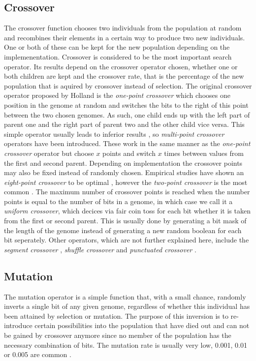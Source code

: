 \subsection{Crossover}
\label{sec:crossover}

The crossover function chooses two individuals from the population at random and recombines their elements in a certain way to produce two new individuals. One or both of these can be kept for the new population depending on the implemenentation. Crossover is considered to be the most important search operator\cite{16}. Its results depend on the crossover operator chosen, whether one or both children are kept and the crossover rate, that is the percentage of the new population that is aquired by crossover instead of selection. The original crossover operator proposed by Holland is the \textit{one-point crossover} which chooses one position in the genome at random and switches the bits to the right of this point between the two chosen genomes. As such, one child ends up with the left part of parent one and the right part of parent two and the other child vice versa. This simple operator usually leads to inferior results \cite{18,19,20}, so \textit{multi-point crossover} operators have been introduced. These work in the same manner as the \textit{one-point crossover} operator but choose $x$ points and switch $x$ times between values from the first and second parent. Depending on implementation the crossover points may also be fixed instead of randomly chosen. Empirical studies have shown an \textit{eight-point crossover} to be optimal \cite{21,22,19}, however the \textit{two-point crossover} is the most common \cite{19}. The maximum number of crossover points is reached when the number points is equal to the number of bits in a genome, in which case we call it a \textit{uniform crossover}, which decices via fair coin toss for each bit whether it is taken from the first or second parent. This is usually done by generating a bit mask of the length of the genome instead of generating a new random boolean for each bit seperately. Other operators, which are not further explained here, include the \textit{segment crossover} \cite{19}, \textit{shuffle crossover} \cite{19} and \textit{punctuated crossover} \cite{23}.

\subsection{Mutation}
\label{sec:mutation}

The mutation operator is a simple function that, with a small chance, randomly inverts a single bit of any given genome, regardless of whether this individual has been attained by selection or mutation. The purpose of this inversion is to re-introduce certain possibilities into the population that have died out and can not be gained by crossover anymore since no member of the population has the necessary combination of bits. The mutation rate is usually very low, 0.001, 0.01 or 0.005 are common \cite{20,23,24}.

